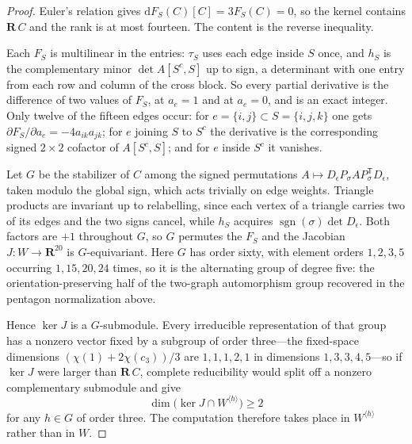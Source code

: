 \begin{proof}
Euler's relation gives \(\mathrm dF_S(C)[C]=3F_S(C)=0\), so the kernel contains
\(\mathbf R\,C\) and the rank is at most fourteen.  The content is the reverse
inequality.

Each \(F_S\) is multilinear in the entries: \(\tau_S\) uses each edge inside
\(S\) once, and \(h_S\) is the complementary minor \(\det A[S^c,S]\) up to sign,
a determinant with one entry from each row and column of the cross block.  So
every partial derivative is the difference of two values of \(F_S\), at
\(a_e=1\) and at \(a_e=0\), and is an exact integer.  Only twelve of the fifteen
edges occur: for \(e=\{i,j\}\subset S=\{i,j,k\}\) one gets
\(\partial F_S/\partial a_e=-4a_{ik}a_{jk}\); for \(e\) joining
\(S\) to \(S^c\) the derivative is the corresponding signed \(2\times2\) cofactor
of \(A[S^c,S]\); and for \(e\) inside \(S^c\) it vanishes.

Let \(G\) be the stabilizer of \(C\) among the signed permutations
\(A\mapsto D_\epsilon P_\sigma AP_\sigma^{\mathsf T}D_\epsilon\), taken modulo
the global sign, which acts trivially on edge weights.  Triangle products are
invariant up to relabelling, since each vertex of a triangle carries two of its
edges and the two signs cancel, while \(h_S\) acquires
\(\operatorname{sgn}(\sigma)\det D_\epsilon\).  Both factors are \(+1\)
throughout \(G\), so \(G\) permutes the \(F_S\) and the Jacobian
\(J\colon W\to\mathbf R^{20}\) is \(G\)-equivariant.  Here \(G\) has order sixty,
with element orders \(1,2,3,5\) occurring \(1,15,20,24\) times, so it is the
alternating group of degree five: the orientation-preserving half of the
two-graph automorphism group recovered in the pentagon normalization above.

Hence \(\ker J\) is a \(G\)-submodule.  Every irreducible representation of that
group has a nonzero vector fixed by a subgroup of order three---the fixed-space
dimensions \((\chi(1)+2\chi(c_3))/3\) are \(1,1,1,2,1\) in dimensions
\(1,3,3,4,5\)---so if \(\ker J\) were larger than \(\mathbf R\,C\), complete
reducibility would split off a nonzero complementary submodule and give
\[
 \dim\bigl(\ker J\cap W^{\langle h\rangle}\bigr)\ge2
\]
for any \(h\in G\) of order three.  The computation therefore takes place in
\(W^{\langle h\rangle}\) rather than in \(W\).


\end{proof}
